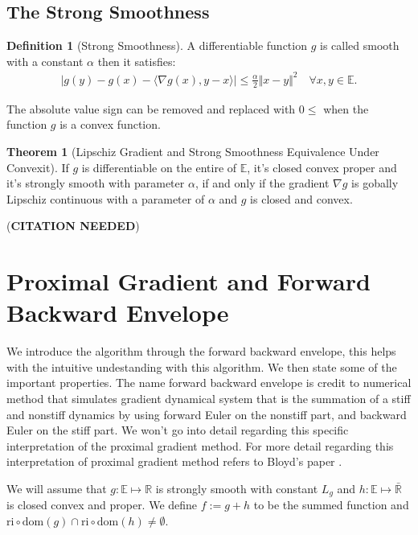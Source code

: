 \documentclass[]{article}
\theoremstyle{definition}
\newtheorem{theorem}{Theorem}       %
\newtheorem{definition}{Definition}
\begin{document}
    \subsection{The Strong Smoothness}
        \begin{definition}[Strong Smoothness]\label{def:strong_smoothness}
            A differentiable function $g$ is called smooth with a constant $\alpha$ then it satisfies: 
            \begin{align}
                |g(y) - g(x) - 
                \langle \nabla g(x), y - x
                \rangle| \le \frac{\alpha}{2}\Vert x - y\Vert^2
                \quad \forall x, y\in \mathbb E. 
            \end{align}    
        \end{definition}
        The absolute value sign can be removed and replaced with $0\le$ when the function $g$ is a convex function.
        \begin{theorem}[Lipschiz Gradient and Strong Smoothness Equivalence Under Convexit]\label{thm:cvx_lipz_grad}
            If $g$ is differentiable on the entire of $\mathbb E$, it's closed convex proper and it's strongly smooth with parameter $\alpha$, if and only if the gradient $\nabla g$ is gobally Lipschiz continuous with a parameter of $\alpha$ and $g$ is closed and convex. 
        \end{theorem}
        (\textbf{CITATION NEEDED})
        
\section{Proximal Gradient and Forward Backward Envelope}\label{sec:pg_forward_backward_env}
    We introduce the algorithm through the forward backward envelope, this helps with the intuitive undestanding with this algorithm. We then state some of the important properties. The name forward backward envelope is credit to numerical method that simulates gradient dynamical system that is the summation of a stiff and nonstiff dynamics by using forward Euler on the nonstiff part, and backward Euler on the stiff part. We won't go into detail regarding this specific interpretation of the proximal gradient method. For more detail regarding this interpretation of proximal gradient method refers to Bloyd's paper \cite{paper:bloyd}. 
    \begin{assumption}\label{assumption:1}
        We will assume that $g:\mathbb E\mapsto \mathbb R$ is strongly smooth with constant $L_g$ and $h:\mathbb E \mapsto \bar{\mathbb R}$ is closed convex and proper. We define $f := g + h$ to be the summed function and $\text{ri}\circ \text{dom}(g) \cap \text{ri}\circ \text{dom}(h) \neq \emptyset$. 
    \end{assumption}
    
\end{document}
